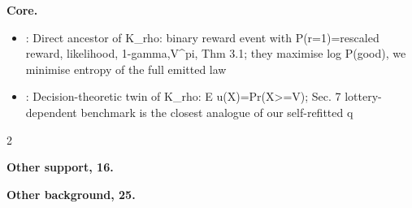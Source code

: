 \documentclass[10pt]{article}
\newcommand{\memb}[1]{\par\smallskip\textbf{#1}\quad}
\begin{document}
\memb{Core.}
\begin{itemize}[nosep,leftmargin=1.2em]
\item \citet{Toussaint-probabilistic06}: Direct ancestor of K\_rho: binary reward event with P(r=1)=rescaled reward, likelihood, 1-gamma,V\^{}pi, Thm 3.1; they maximise log P(good), we minimise entropy of the full emitted law
\item \citet{Castagnoli-expected96}: Decision-theoretic twin of K\_rho: E u(X)=Pr(X\textgreater{}=V); Sec. 7 lottery-dependent benchmark is the closest analogue of our self-refitted q
\end{itemize}
\begin{multicols}{2}
\memb{Other support, 16.} \citetext{\citealp{Cooper-method88}; \citealp{Dayan-using97}; \citealp{Peters-reinforcement07}; \citealp{Toussaint-expectation11}; \citealp{Fu-variational18}; \citealp{Strupl-reward21}; \citealp{Tajwar-maximum26}; \citealp{White-minimizing93}; \citealp{Castagnoli-expected94}\dag; \citealp{Bouakiz-targetlevel95}; \citealp{Bordley-decision00}\dag; \citealp{Abbas-normative05}; \citealp{Kolobov-theory12}; \citealp{Everitt-reinforcement17}; \citealp{Wang-reinforcement20}; \citealp{Skalse-defining22}}

\memb{Other background, 25.} {\footnotesize \citetext{\citealp{Shachter-decision92}; \citealp{Attias-planning03}\dag; \citealp{Hoffman-expectation09}\dag; \citealp{Kober-policy10}\dag; \citealp{Botvinick-planning12}; \citealp{Deisenroth-survey13}\dag; \citealp{Wu-minimizing99}; \citealp{Ohtsubo-optimal02}\dag; \citealp{Abbas-entropy03}\dag; \citealp{Bordley-multiattribute04}; \citealp{Abbas-maximum06}; \citealp{Abbas-effective08}; \citealp{Abbas-normative09}; \citealp{Bordley-targetbased16}\dag; \citealp{Zhao-reducing25}; \citealp{Ring-delusion11}; \citealp{Mancuso-detecting19}; \citealp{Uesato-avoiding20}; \citealp{Everitt-reward21}; \citealp{Pan-effects22}; \citealp{Gao-scaling23}; \citealp{Karwowski-goodhart23}; \citealp{Cai-reinforcement25}; \citealp{Chen-distributional24}; \citealp{Plesner-imperfect26}}}

\end{multicols}
\end{document}
